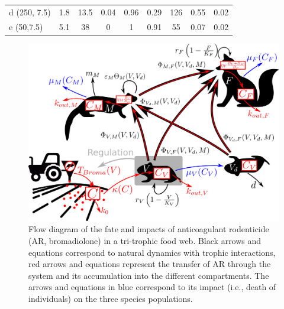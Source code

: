 \documentclass[11pt]{article}
\begin{document}
\begin{table}
\begin{tabular}{p{2cm} c c c c c c c c}
		d (250, 7.5)               & 1.8                        & 13.5                        & 0.04                          & 0.96                            & 0.29                          & 126                         & 0.55                        & 0.02                        \\
		e (50,7.5)                 & 5.1                        & 38                        & 0                             & 1                               & 0.91                          & 55                          & 0.07                        & 0.02                        \\ \hline
	\end{tabular}
\end{table}


\begin{figure}
	\begin{center}
		\includegraphics[width=.8\linewidth]{img/system_scheme.png}
		\caption{Flow diagram of the fate and impacts of anticoagulant rodenticide (AR, bromadiolone) in a tri-trophic food web. Black arrows and equations correspond to natural dynamics with trophic interactions, red arrows and equations represent the transfer of AR through the system and its accumulation into the different compartments. The arrows and equations in blue correspond to its impact (i.e., death of individuals) on the three species populations.}
		\label{fig:scheme}
	\end{center}
\end{figure}

\end{document}
